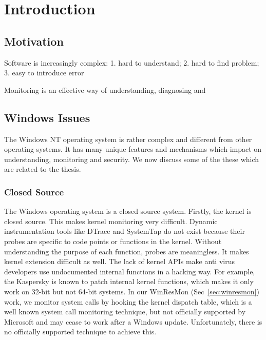 \chapter{Introduction}

\section{Motivation}


Software is increasingly complex:
1. hard to understand;
2. hard to find problem;
3. easy to introduce error

Monitoring is an effective way of understanding, diagnosing and 

\section{Windows Issues}
\label{sec:win-issue}

The Windows NT operating system is rather complex and different from other
operating systems.
It has many unique features and mechanisms which impact on understanding,
monitoring and security.
We now discuss some of the these which are related to the thesis.

\subsection{Closed Source}

The Windows operating system is a closed source system.
Firstly, the kernel is closed source.
This makes kernel monitoring very difficult.
Dynamic instrumentation tools like DTrace and SystemTap do not exist because
their probes are specific to code points or functions in the kernel.
Without understanding the purpose of each function, probes are meaningless.
It makes kernel extension difficult as well.
The lack of kernel APIs make anti virus developers use undocumented internal
functions in a hacking way.
For example, the Kaspersky is known \cite{skywing2006avwrong} to patch internal
kernel functions, which makes it only work on 32-bit but not 64-bit systems.
In our WinResMon (Sec~\ref{sec:winresmon}) work, we monitor system calls
by hooking the kernel dispatch table, which is a well known
system call monitoring technique,
but not officially supported by Microsoft and may cease to work
after a Windows update.
Unfortunately, there is no officially supported technique to achieve this.

